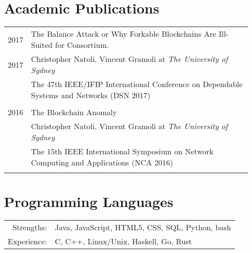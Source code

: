 \documentclass[10pt]{article}
\begin{document}
%
\section{Academic Publications}
\begin{tabular}{r p{11cm}}
2017 & The Balance Attack or Why Forkable Blockchains Are Ill-Suited for Consortium.\\ 2017 & Christopher Natoli, Vincent Gramoli at \emph{The University of Sydney} \\ & \footnotesize{The 47th IEEE/IFIP International Conference on Dependable Systems and Networks (DSN 2017)}\\\multicolumn{2}{c}{}\\
2016 & The Blockchain Anomaly\\ & Christopher Natoli, Vincent Gramoli at \emph{The University of Sydney} \\ & \footnotesize{The 15th IEEE International Symposium on Network Computing and Applications (NCA 2016)}\\\multicolumn{2}{c}{}\\
\end{tabular}

\section{Programming Languages}
\begin{tabular}{rl}
Strengths: & Java, JavaScript, HTML5, CSS, SQL, Python, bash\\
Experience: & C, C++, Linux/Unix, Haskell, Go, Rust
\end{tabular}
\end{document}
